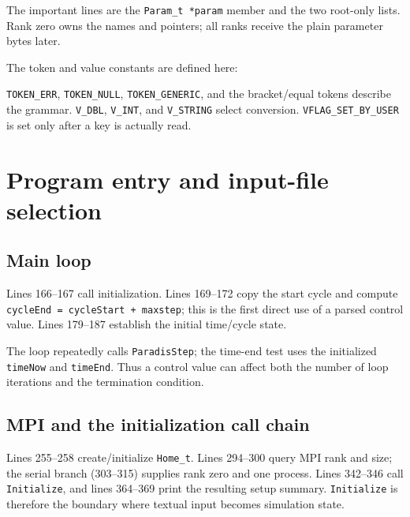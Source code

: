 \documentclass[11pt]{article}
\newcommand{\code}[1]{\texorpdfstring{\nolinkurl{#1}}{#1}}
\begin{document}

The important lines are the \code{Param_t *param} member and the two root-only lists. Rank zero owns the names and pointers; all ranks receive the plain parameter bytes later.

The token and value constants are defined here:

\code{TOKEN_ERR}, \code{TOKEN_NULL}, \code{TOKEN_GENERIC}, and the bracket/equal tokens describe the grammar. \code{V_DBL}, \code{V_INT}, and \code{V_STRING} select conversion. \code{VFLAG_SET_BY_USER} is set only after a key is actually read.

\section{Program entry and input-file selection}
\subsection{Main loop}

Lines 166--167 call initialization. Lines 169--172 copy the start cycle and compute \code{cycleEnd = cycleStart + maxstep}; this is the first direct use of a parsed control value. Lines 179--187 establish the initial time/cycle state.

The loop repeatedly calls \code{ParadisStep}; the time-end test uses the initialized \code{timeNow} and \code{timeEnd}. Thus a control value can affect both the number of loop iterations and the termination condition.

\subsection{MPI and the initialization call chain}

Lines 255--258 create/initialize \code{Home_t}. Lines 294--300 query MPI rank and size; the serial branch (303--315) supplies rank zero and one process. Lines 342--346 call \code{Initialize}, and lines 364--369 print the resulting setup summary. \code{Initialize} is therefore the boundary where textual input becomes simulation state.
\end{document}
